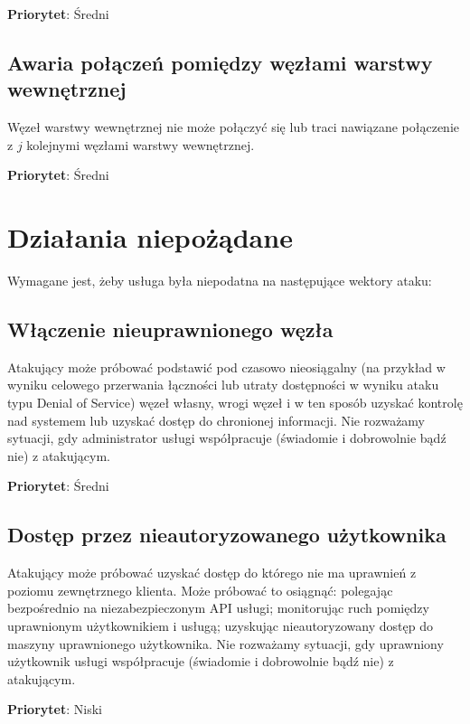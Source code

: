 \documentclass[a4paper,11pt]{article}
\begin{document}
\textbf{Priorytet}: Średni

\subsection{Awaria połączeń pomiędzy węzłami warstwy wewnętrznej}
Węzeł warstwy wewnętrznej nie może połączyć się lub traci nawiązane
połączenie z $j$ kolejnymi węzłami warstwy wewnętrznej.

\textbf{Priorytet}: Średni


\section{Działania niepożądane}
Wymagane jest, żeby usługa była niepodatna na następujące wektory ataku:

\subsection{Włączenie nieuprawnionego węzła}
Atakujący może próbować podstawić pod czasowo nieosiągalny (na przykład
w wyniku celowego przerwania łączności lub utraty dostępności w wyniku
ataku typu Denial of Service) węzeł własny, wrogi węzeł i w ten sposób
uzyskać kontrolę nad systemem lub uzyskać dostęp do chronionej
informacji. Nie rozważamy sytuacji, gdy administrator usługi
współpracuje (świadomie i dobrowolnie bądź nie) z atakującym.

\textbf{Priorytet}: Średni

\subsection{Dostęp przez nieautoryzowanego użytkownika}
Atakujący może próbować uzyskać dostęp do którego nie ma uprawnień z
poziomu zewnętrznego klienta. Może próbować to osiągnąć: polegając
bezpośrednio na niezabezpieczonym API usługi; monitorując ruch pomiędzy
uprawnionym użytkownikiem i usługą; uzyskując nieautoryzowany dostęp do
maszyny uprawnionego użytkownika. Nie rozważamy sytuacji, gdy uprawniony
użytkownik usługi współpracuje (świadomie i dobrowolnie bądź nie) z
atakującym.

\textbf{Priorytet}: Niski
\end{document}
